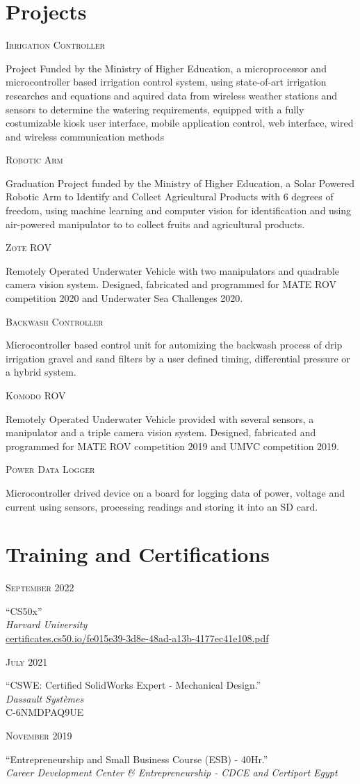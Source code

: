 \documentclass[a4paper]{article}
\newcommand{\entry}[4]{   %
	\begin{center}
		\begin{minipage}[c]{0.25\linewidth}  %
			\vfill
			\hfill  %
			\textsc{#1}  %
			\vfill
		\end{minipage}
		\hfill\vline\hfill  %
		\begin{minipage}[c]{0.7\linewidth}
			\textrm{``#2''} \\
			\textit{#3} \\
			\footnotesize{#4}
		\end{minipage}
	\end{center}
}
\newcommand{\smallentry}[2]{   %
	\begin{center}
		\begin{minipage}[c]{0.25\linewidth}  %
			\vfill
			\hfill  %
			\textsc{#1}  %
			\vfill
		\end{minipage}
		\hfill\vline\hfill  %
		\begin{minipage}[c]{0.7\linewidth}
			\vfill
			\textrm{#2} 
			\vfill
		\end{minipage}
	\end{center}
	\vspace{0.5em} 
}
\begin{document}


	\section{Projects}
		\smallentry{\footnotesize{Irrigation Controller}}
			{Project Funded by the Ministry of Higher Education, a microprocessor and microcontroller based irrigation control system, using state-of-art irrigation researches and equations and aquired data from wireless weather stations and sensors to determine the watering requirements, equipped with a fully costumizable kiosk user interface, mobile application control, web interface, wired and wireless communication methods}
		\smallentry{Robotic Arm}
			{Graduation Project funded by the Ministry of Higher Education, a Solar Powered Robotic Arm to Identify and Collect Agricultural Products with 6 degrees of freedom, using machine learning and computer vision for identification and using air-powered manipulator to to collect fruits and agricultural products.}
		\smallentry{Zote ROV}
			{Remotely Operated Underwater Vehicle with two manipulators and quadrable camera vision system. Designed, fabricated and programmed for MATE ROV competition 2020 and Underwater Sea Challenges 2020.}
		\smallentry{\small{Backwash Controller}}
			{Microcontroller based control unit for automizing the backwash process of drip irrigation gravel and sand filters by a user defined timing, differential pressure or a hybrid system.}
		\smallentry{Komodo ROV}
			{Remotely Operated Underwater Vehicle provided with several sensors, a manipulator and a triple camera vision system. Designed, fabricated and programmed for MATE ROV competition 2019 and UMVC competition 2019.}
		\smallentry{Power Data Logger}
			{Microcontroller drived device on a board for logging data of power, voltage and current using sensors, processing readings and storing it into an SD card.}


	\section{Training and Certifications}
		\entry{September 2022}
			{CS50x}
			{Harvard University}
			{\url{certificates.cs50.io/fe015e39-3d8e-48ad-a13b-4177ec41e108.pdf}}
		\entry{July 2021}
			{CSWE: Certified SolidWorks Expert - Mechanical Design.}
			{Dassault Systèmes}
			{C-6NMDPAQ9UE}
		\entry{November 2019}
			{Entrepreneurship and Small Business Course (ESB) - 40Hr.}
			{Career Development Center \& Entrepreneurship - CDCE and Certiport Egypt}
			{}
\end{document}
